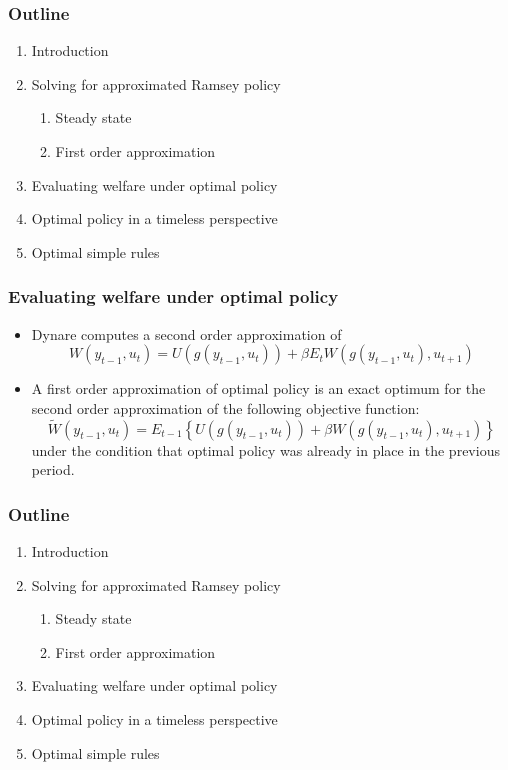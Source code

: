 \documentclass{beamer}
\begin{document}
\begin{frame}
  \frametitle{Outline}
  \begin{enumerate}
  \item Introduction
  \item Solving for approximated Ramsey policy
    \begin{enumerate}
    \item Steady state
    \item First order approximation
    \end{enumerate}
  \item {\red Evaluating welfare under optimal policy}
  \item Optimal policy in a timeless perspective
  \item Optimal simple rules
  \end{enumerate}
\end{frame}

\begin{frame}
  \frametitle{Evaluating welfare under optimal policy}
\begin{itemize}
\item Dynare computes a second order approximation of
\[
W\left(y_{t-1},u_t\right) = U\left(g\left(y_{t-1},u_t\right)\right)+\beta E_t W\left(g\left(y_{t-1},u_t\right),u_{t+1}\right)
\]
\item A first order approximation of optimal policy is an exact optimum for the second order approximation of the following objective function:
\[
\widetilde W\left(y_{t-1},u_t\right) = E_{t-1}\left\{U\left(g\left(y_{t-1},u_t\right)\right)+\beta W\left(g\left(y_{t-1},u_t\right),u_{t+1}\right)\right\}
\]
under the condition that optimal policy was already in place in the previous period.
\end{itemize}
\end{frame}

\begin{frame}
  \frametitle{Outline}
  \begin{enumerate}
  \item Introduction
  \item Solving for approximated Ramsey policy
    \begin{enumerate}
    \item Steady state
    \item First order approximation
    \end{enumerate}
  \item Evaluating welfare under optimal policy
  \item {\red Optimal policy in a timeless perspective}
  \item Optimal simple rules
  \end{enumerate}
\end{frame}
\end{document}
